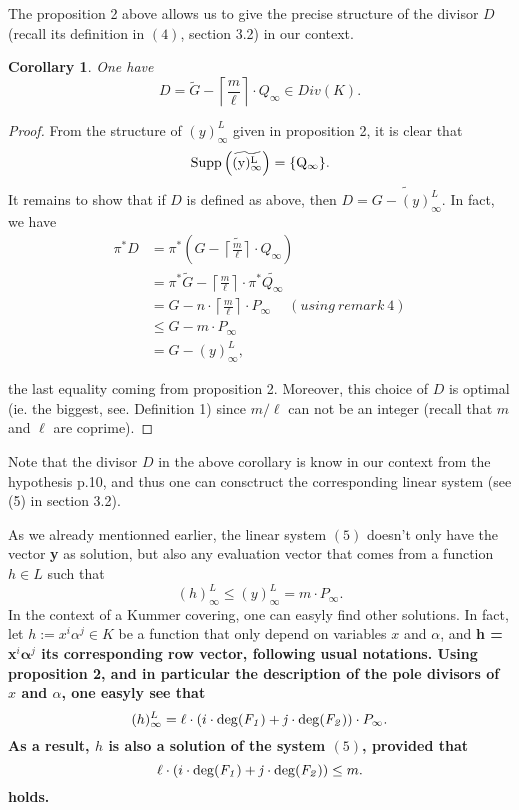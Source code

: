 \documentclass[10pt]{article}
\newtheorem{coro1}{Corollary}[]
\newcommand{\s}{\vspace{0.3cm}}
\newcommand{\cd}{\cdot}
\begin{document}
\s

The proposition 2 above allows us to give the precise structure of the divisor $D$ (recall its definition in $(4)$, section 3.2) in our context.

\s

\begin{coro1}
One have
\[D = \tilde{G} - \left\lceil\frac{m}{\ell}\right\rceil \cd Q_{\infty} \in Div(K).\]
\end{coro1}

\s

\begin{proof}
From the structure of $(y)^L_{\infty}$ given in proposition 2, it is clear that 
\[\rm{Supp}\left(\widetilde{(y)^L_{\infty}}\right) = \{Q_{\infty}\}.\]
It remains to show that if $D$ is defined as above, then $D = \widetilde{G - (y)^L_{\infty}}$. In fact, we have
\begin{align*}
\pi^*D &= \pi^* \left(\widetilde{G - \left\lceil\frac{m}{\ell}\right\rceil \cd Q_{\infty}}\right) \\
&= \pi^*\tilde{G} - \left\lceil\frac{m}{\ell}\right\rceil \cd \pi^*\widetilde{Q_{\infty}} \\
&= G - n \cd \left\lceil\frac{m}{\ell}\right\rceil \cd P_{\infty} \ \quad (using \ remark \ 4) \\
& \leq G - m \cd P_{\infty} \\
&= G-(y)^L_{\infty},
\end{align*}

the last equality coming from proposition 2. Moreover, this choice of $D$ is optimal (ie. the biggest, see. Definition 1) since $m/\ell$ can not be an integer (recall that $m$ and $\ell$ are coprime).
\end{proof}

\s

Note that the divisor $D$ in the above corollary is know in our context from the hypothesis p.10, and thus one can consctruct the corresponding linear system (see (5) in section 3.2).

\s

As we already mentionned earlier, the linear system $(5)$ doesn't only have the vector \textbf{y} as solution, but also any evaluation vector that comes from a function $h \in L$ such that 
\[(h)^L_{\infty} \leq (y)^L_{\infty} = m \cd P_{\infty}.\]
In the context of a Kummer covering, one can easyly find other solutions. In fact, let $h := x^i\alpha^j \in K$ be a function that only depend on variables $x$ and $\alpha$, and \bf{h} \rm = \textbf{x}$^i\boldsymbol{\alpha}^j$ \rm its corresponding row vector, following usual notations. Using proposition 2, and in particular the description of the pole divisors of $x$ and $\alpha$, one easyly see that 
\[ (h)^L_{\infty} = \ell \cd \left(i \cd \rm{deg}\it(F_1)+j \cd \rm{deg}\it(F_2)\right) \cd P_{\infty}.\]
As a result, $h$ is also a solution of the system $(5)$, provided that
\[\ell \cd \left(i \cd \rm{deg}\it(F_1)+j \cd \rm{deg}\it(F_2)\right) \leq m.\]
holds.
\end{document}
